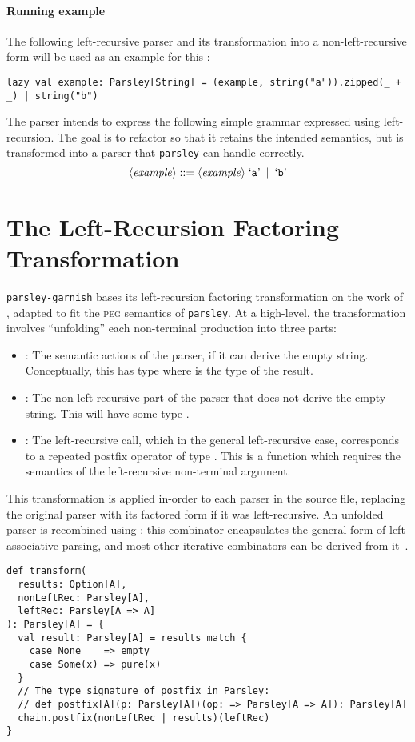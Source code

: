 \documentclass[../../main.tex]{subfiles}
\begin{document}
\paragraph{Running example}
The following left-recursive parser and its transformation into a non-left-recursive form will be used as an example for this :
\begin{verbatim}
lazy val example: Parsley[String] = (example, string("a")).zipped(_ + _) | string("b")
\end{verbatim}
%
The  parser intends to express the following simple grammar expressed using left-recursion. The goal is to refactor  so that it retains the intended semantics, but is transformed into a parser that \texttt{parsley} can handle correctly.
\begin{equation*}
\langle \mathit{example} \rangle ::= \langle \mathit{example} \rangle \; \text{`\texttt{a}'} \enspace | \enspace \text{`\texttt{b}'}
\end{equation*}

\section{The Left-Recursion Factoring Transformation}
\texttt{parsley-garnish} bases its left-recursion factoring transformation on the work of \textcite{baars_leftrec_2004}, adapted to fit the \textsc{peg} semantics of \texttt{parsley}.
At a high-level, the transformation involves ``unfolding'' each non-terminal production into three parts:
\begin{itemize}
  \item {}: The semantic actions of the parser, if it can derive the empty string. Conceptually, this has type  where  is the type of the result.
  \item {}: The non-left-recursive part of the parser that does not derive the empty string. This will have some type .
  \item {}: The left-recursive call, which in the general left-recursive case, corresponds to a repeated postfix operator of type . This is a function which requires the semantics of the left-recursive non-terminal argument.
\end{itemize}
%
This transformation is applied in-order to each parser in the source file, replacing the original parser with its factored form if it was left-recursive.
An unfolded parser is recombined using : this combinator encapsulates the general form of left-associative parsing, and most other iterative combinators can be derived from it~\cite{willis_parsley_2024}.
\begin{verbatim}
def transform(
  results: Option[A],
  nonLeftRec: Parsley[A],
  leftRec: Parsley[A => A]
): Parsley[A] = {
  val result: Parsley[A] = results match {
    case None    => empty
    case Some(x) => pure(x)
  }
  // The type signature of postfix in Parsley:
  // def postfix[A](p: Parsley[A])(op: => Parsley[A => A]): Parsley[A]
  chain.postfix(nonLeftRec | results)(leftRec)
}
\end{verbatim}
\end{document}
